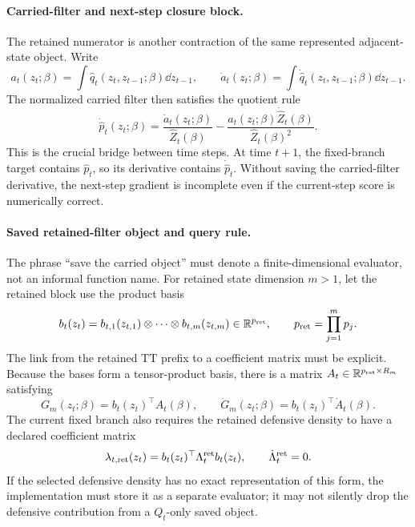 \paragraph{Carried-filter and next-step closure block.}
The retained numerator is another contraction of the same represented
adjacent-state object.  Write
\begin{equation}
  a_t(z_t;\beta)=
  \int \widehat q_t(z_t,z_{t-1};\beta)\dd z_{t-1},
  \qquad
  \dot a_t(z_t;\beta)=
  \int \dot{\widehat q}_t(z_t,z_{t-1};\beta)\dd z_{t-1}.
  \label{eq:bf-hd-ttkr-carried-numerator}
\end{equation}
The normalized carried filter then satisfies the quotient rule
\begin{equation}
  \dot{\widehat p}_t(z_t;\beta)=
  \frac{\dot a_t(z_t;\beta)}{\widehat Z_t(\beta)}
  -
  \frac{a_t(z_t;\beta)\dot{\widehat Z}_t(\beta)}{\widehat Z_t(\beta)^2}.
  \label{eq:bf-hd-ttkr-dot-carried-filter}
\end{equation}
This is the crucial bridge between time steps.  At time \(t+1\), the fixed-branch
target contains \(\widehat p_t\), so its derivative contains
\(\dot{\widehat p}_t\).  Without saving the carried-filter derivative, the
next-step gradient is incomplete even if the current-step score is numerically
correct.

\paragraph{Saved retained-filter object and query rule.}
The phrase “save the carried object” must denote a finite-dimensional evaluator,
not an informal function name.  For retained state dimension $m>1$, let the
retained block use the product basis
\begin{equation}
  b_t(z_t)=b_{t,1}(z_{t,1})\otimes\cdots\otimes b_{t,m}(z_{t,m})
  \in\mathbb{R}^{p_{\rm ret}},
  \qquad
  p_{\rm ret}=\prod_{j=1}^m p_j.
  \label{eq:bf-hd-ttkr-retained-product-basis}
\end{equation}
The link from the retained TT prefix to a coefficient matrix must be explicit.
Because the bases form a tensor-product basis, there is a matrix
\(A_t\in\mathbb{R}^{p_{\rm ret}\times R_m}\) satisfying
\begin{equation}
  G_m(z_t;\beta)=b_t(z_t)^\top A_t(\beta),
  \qquad
  \dot G_m(z_t;\beta)=b_t(z_t)^\top\dot A_t(\beta).
  \label{eq:bf-hd-ttkr-retained-prefix-coefficients}
\end{equation}
The current fixed branch also requires the retained defensive density to have a
declared coefficient matrix
\begin{equation}
  \lambda_{t,\mathrm{ret}}(z_t)
  =b_t(z_t)^\top\Lambda_t^{\rm ret}b_t(z_t),
  \qquad
  \dot\Lambda_t^{\rm ret}=0.
  \label{eq:bf-hd-ttkr-defensive-retained-coefficients}
\end{equation}
If the selected defensive density has no exact representation of this form,
the implementation must store it as a separate evaluator; it may not silently
drop the defensive contribution from a \(Q_t\)-only saved object.

